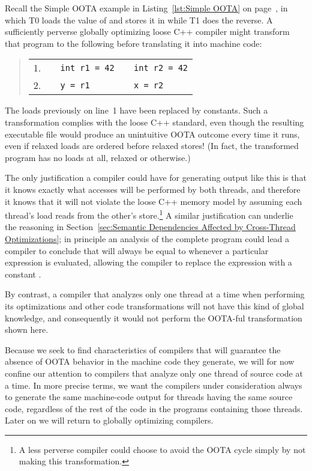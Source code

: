 Recall the Simple OOTA example in Listing~\ref{lst:Simple OOTA} on
page~\pageref{lst:Simple OOTA},
in which T0 loads the value of  and stores it in  while T1
does the reverse.
A sufficiently perverse globally optimizing loose C++ compiler might
transform that program to the following before translating it into
machine code:
\begin{quote}
\small
\begin{tabular}{r|l|l}
1. &
\texttt{~~int r1 = 42} &
	\texttt{~~int r2 = 42} \\
2. &
\texttt{~~y = r1} &
	\texttt{~~x = r2} \\
\end{tabular}
\end{quote}
The loads previously on line~1 have been replaced by constants.
Such a transformation complies with the loose C++ standard,
even though the resulting executable file would produce an unintuitive
OOTA outcome every time it runs, even if relaxed loads are ordered
before relaxed stores!
(In fact, the transformed program has no loads at all, relaxed or otherwise.)

The only justification a compiler could have for generating output like
this is that it knows exactly what accesses will be performed by both
threads, and therefore it knows that it will not violate the loose C++
memory model by assuming each thread's load reads from the other's
store.\footnote{
	A less perverse compiler could choose to avoid the
	OOTA cycle simply by not making this transformation.}
A similar justification can underlie the reasoning in
Section~\ref{sec:Semantic Dependencies Affected by Cross-Thread Optimizations};
in principle an analysis of the complete program could lead a compiler
to conclude that  will always be equal to  whenever a
particular  expression is evaluated, allowing the compiler
to replace the expression with a constant .

By contrast, a compiler that analyzes only one thread at a time when
performing its optimizations and other code transformations will not
have this kind of global knowledge, and consequently it would not
perform the OOTA-ful transformation shown here.

Because we seek to find characteristics of compilers that will
guarantee the absence of OOTA behavior in the machine code they generate,
we will for now confine our attention to compilers that analyze only
one thread of source code at a time.
In more precise terms, we want the compilers under consideration
always to generate the same machine-code output for threads having
the same source code, regardless of the rest of the code in the programs
containing those threads.
Later on we will return to globally optimizing compilers.

